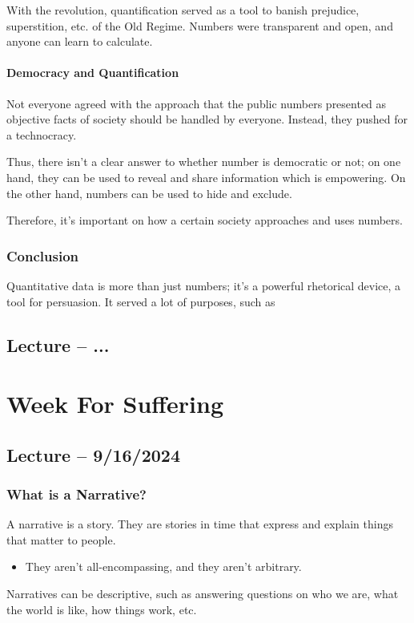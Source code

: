 \documentclass[openany]{book}
\begin{document}
With the revolution, quantification served as a tool to banish prejudice, superstition, etc. of the Old Regime. Numbers were transparent and open, and anyone can learn to calculate.

\subsubsection{Democracy and Quantification}
Not everyone agreed with the approach that the public numbers presented as objective facts of society should be handled by everyone. Instead, they pushed for a technocracy.

Thus, there isn't a clear answer to whether number is democratic or not; on one hand, they can be used to reveal and share information which is empowering. On the other hand, numbers can be used to hide and exclude.

Therefore, it's important on how a certain society approaches and uses numbers.

\subsection{Conclusion}
Quantitative data is more than just numbers; it's a powerful rhetorical device, a tool for persuasion. It served a lot of purposes, such as 

\section{Lecture -- ...}

\chapter{Week For Suffering}
\section{Lecture -- 9/16/2024}
\subsection{What is a Narrative?}
A narrative is a story. They are stories in time that express and explain things that matter to people.
\begin{itemize}
	\item They aren't all-encompassing, and they aren't arbitrary.
\end{itemize}

Narratives can be descriptive, such as answering questions on who we are, what the world is like, how things work, etc.
\end{document}

